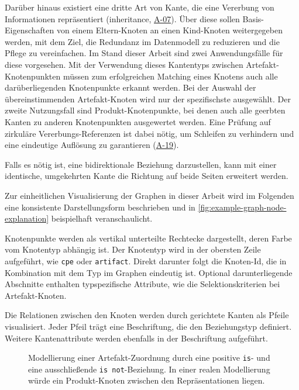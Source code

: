 Darüber hinaus existiert eine dritte Art von Kante, die eine Vererbung von Informationen repräsentiert (inheritance, \hyperref[subsec:req-selektor-inheritance]{A-07}).
Über diese sollen Basis-Eigenschaften von einem Eltern-Knoten an einen Kind-Knoten weitergegeben werden, mit dem Ziel, die Redundanz im Datenmodell zu reduzieren und die Pflege zu vereinfachen.
Im Stand dieser Arbeit sind zwei Anwendungsfälle für diese vorgesehen.
Mit der Verwendung dieses Kantentyps zwischen Artefakt-Knotenpunkten müssen zum erfolgreichen Matching eines Knotens auch alle darüberliegenden Knotenpunkte erkannt werden.
Bei der Auswahl der übereinstimmenden Artefakt-Knoten wird nur der spezifischste ausgewählt.
Der zweite Nutzungsfall sind Produkt-Knotenpunkte, bei denen auch alle geerbten Kanten zu anderen Knotenpunkten ausgewertet werden.
Eine Prüfung auf zirkuläre Vererbungs-Referenzen ist dabei nötig, um Schleifen zu verhindern und eine eindeutige Auflösung zu garantieren (\hyperref[subsec:req-graph-inner-consistency]{A-19}).

Falls es nötig ist, eine bidirektionale Beziehung darzustellen, kann mit einer identische, umgekehrten Kante die Richtung auf beide Seiten erweitert werden.

\medskip

Zur einheitlichen Visualisierung der Graphen in dieser Arbeit wird im Folgenden eine konsistente Darstellungsform beschrieben und in \autoref{fig:example-graph-node-explanation} beispielhaft veranschaulicht.

Knotenpunkte werden als vertikal unterteilte Rechtecke dargestellt, deren Farbe vom Knotentyp abhängig ist.
Der Knotentyp wird in der obersten Zeile aufgeführt, wie \texttt{cpe} oder \texttt{artifact}.
Direkt darunter folgt die Knoten-Id, die in Kombination mit dem Typ im Graphen eindeutig ist.
Optional darunterliegende Abschnitte enthalten typspezifische Attribute, wie die Selektionskriterien bei Artefakt-Knoten.

Die Relationen zwischen den Knoten werden durch gerichtete Kanten als Pfeile visualisiert.
Jeder Pfeil trägt eine Beschriftung, die den Beziehungstyp definiert.
Weitere Kantenattribute werden ebenfalls in der Beschriftung aufgeführt.

\begin{figure}[htbp]
    \centering
    \makebox[\textwidth]{}
    \caption{Modellierung einer Artefakt-Zuordnung durch eine positive \texttt{is}- und eine ausschließende \texttt{is not}-Beziehung. In einer realen Modellierung würde ein Produkt-Knoten zwischen den Repräsentationen liegen.}
    \label{fig:example-graph-node-explanation}
\end{figure}

